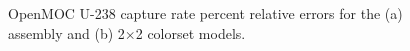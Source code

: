 \begin{figure}[h!]
\begin{subfigure}{0.35\textwidth}
  \caption{}
  \label{fig:reflector-capt-error}
\end{subfigure}
\caption{OpenMOC U-238 capture rate percent relative errors for the (a) assembly and (b) 2$\times$2 colorset models.}
\label{fig:capt-errors}
\end{figure}

